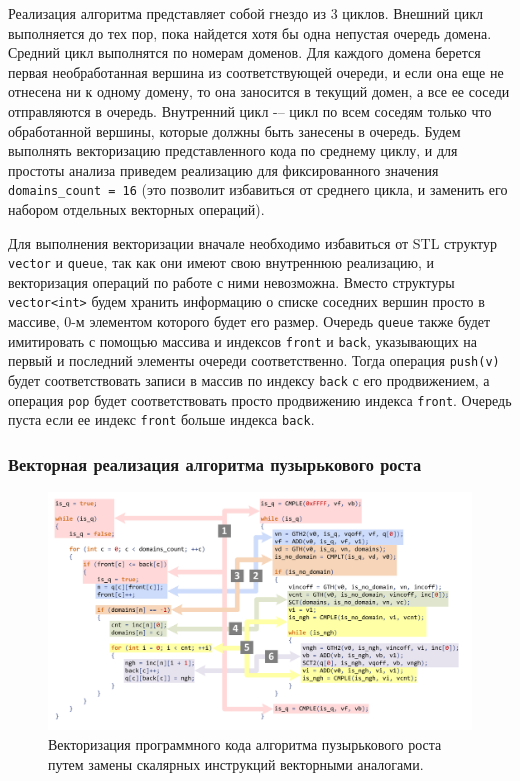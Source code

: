 Реализация алгоритма представляет собой гнездо из 3 циклов.
Внешний цикл выполняется до тех пор, пока найдется хотя бы одна непустая очередь домена.
Средний цикл выполнятся по номерам доменов.
Для каждого домена берется первая необработанная вершина из соответствующей очереди, и если она еще не отнесена ни к одному домену, то она заносится в текущий домен, а все ее соседи отправляются в очередь.
Внутренний цикл -– цикл по всем соседям только что обработанной вершины, которые должны быть занесены в очередь.
Будем выполнять векторизацию представленного кода по среднему циклу, и для простоты анализа приведем реализацию для фиксированного значения \texttt{domains\_count = 16} (это позволит избавиться от среднего цикла, и заменить его набором отдельных векторных операций).

Для выполнения векторизации вначале необходимо избавиться от STL структур \texttt{vector}  и \texttt{queue}, так как они имеют свою внутреннюю реализацию, и векторизация операций по работе с ними невозможна.
Вместо структуры \texttt{vector<int>} будем хранить информацию о списке соседних вершин просто в массиве, 0-м элементом которого будет его размер.
Очередь \texttt{queue} также будет имитировать с помощью массива и индексов \texttt{front} и \texttt{back}, указывающих на первый и последний элементы очереди соответственно.
Тогда операция \texttt{push(v)} будет соответствовать записи в массив по индексу \texttt{back} с его продвижением, а операция \texttt{pop} будет соответствовать просто продвижению индекса \texttt{front}.
Очередь пуста если ее индекс \texttt{front} больше индекса \texttt{back}.

\subsubsection{Векторная реализация алгоритма пузырькового роста}

\begin{figure}[ht]
\centering
\includegraphics[width=1.0\textwidth]{pics/text_4_vec_integer/code.pdf}
\caption{Векторизация программного кода алгоритма пузырькового роста путем замены скалярных инструкций векторными аналогами.}
\label{fig:text_4_vec_integer_code}
\end{figure}

